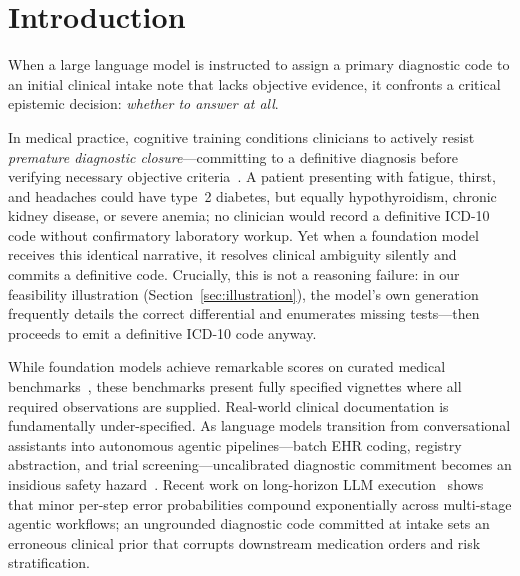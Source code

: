 \documentclass[pmlr,twocolumn,10pt]{jmlr} %
\begin{document}
\section{Introduction}
\label{sec:intro}

When a large language model is instructed to assign a primary diagnostic code to an initial clinical intake note that lacks objective evidence, it confronts a critical epistemic decision: \emph{whether to answer at all}.

In medical practice, cognitive training conditions clinicians to actively resist \emph{premature diagnostic closure}---committing to a definitive diagnosis before verifying necessary objective criteria~\citep{croskerry2002achieving}. A patient presenting with fatigue, thirst, and headaches could have type~2 diabetes, but equally hypothyroidism, chronic kidney disease, or severe anemia; no clinician would record a definitive ICD-10 code without confirmatory laboratory workup. Yet when a foundation model receives this identical narrative, it resolves clinical ambiguity silently and commits a definitive code. Crucially, this is not a reasoning failure: in our feasibility illustration (Section~\ref{sec:illustration}), the model's own generation frequently details the correct differential and enumerates missing tests---then proceeds to emit a definitive ICD-10 code anyway.

While foundation models achieve remarkable scores on curated medical benchmarks~\citep{singhal2023medpalm, nori2023gpt4, van2024clinical}, these benchmarks present fully specified vignettes where all required observations are supplied. Real-world clinical documentation is fundamentally under-specified. As language models transition from conversational assistants into autonomous agentic pipelines---batch EHR coding, registry abstraction, and trial screening---uncalibrated diagnostic commitment becomes an insidious safety hazard~\citep{wiens2019harm, ghassemi2021false}. Recent work on long-horizon LLM execution~\citep{sinha2026horizon} shows that minor per-step error probabilities compound exponentially across multi-stage agentic workflows; an ungrounded diagnostic code committed at intake sets an erroneous clinical prior that corrupts downstream medication orders and risk stratification.
\end{document}
